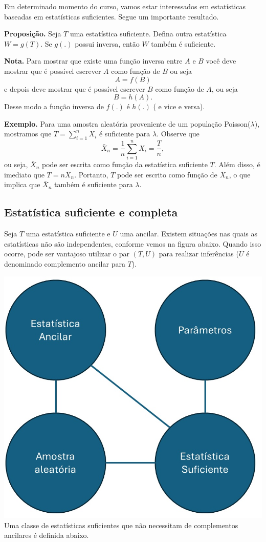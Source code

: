 \documentclass[
  letterpaper,
  DIV=11,
  numbers=noendperiod]{scrartcl}
\begin{document}
Em determinado momento do curso, vamos estar interessados em
estatísticas baseadas em estatísticas suficientes. Segue um importante
resultado.

\textbf{Proposição.} Seja \(T\) uma estatística suficiente. Defina outra
estatística \(W=g(T)\). Se \(g(.)\) possui inversa, então \(W\) também é
suficiente.

\textbf{Nota.} Para mostrar que existe uma função inversa entre \(A\) e
\(B\) você deve mostrar que é possível escrever \(A\) como função de
\(B\) ou seja \[A=f(B)\] e depois deve mostrar que é possível escrever
\(B\) como função de \(A\), ou seja \[B=h(A).\] Desse modo a função
inversa de \(f(.)\) é \(h(.)\) ( e vice e versa).

\textbf{Exemplo.} Para uma amostra aleatória proveniente de um população
Poisson(\(\lambda\)), mostramos que \(T=\sum_{i=1}^n X_i\) é suficiente
para \(\lambda\). Observe que
\[\bar{X}_n=\frac{1}{n}\sum_{i=1}^n X_i=\frac{T}{n},\] ou seja,
\(\bar{X}_n\) pode ser escrita como função da estatística suficiente
\(T\). Além disso, é imediato que \(T=n\bar{X}_n\). Portanto, \(T\) pode
ser escrito como função de \(\bar{X}_n\), o que implica que
\(\bar{X}_n\) também é suficiente para \(\lambda\).

\subsection{Estatística suficiente e
completa}\label{estatuxedstica-suficiente-e-completa}

Seja \(T\) uma estatística suficiente e \(U\) uma ancilar. Existem
situações nas quais as estatísticas não são independentes, conforme
vemos na figura abaixo. Quando isso ocorre, pode ser vantajoso utilizar
o par \((T,U)\) para realizar inferências (\(U\) é denominado
complemento ancilar para \(T\)).

\includegraphics{fig_stat_suficiente_ancilar.jpg} Uma classe de
estatísticas suficientes que não necessitam de complementos ancilares é
definida abaixo.
\end{document}
